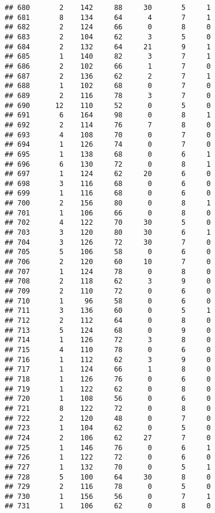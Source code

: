 \documentclass[
]{article}
\begin{document}
\begin{verbatim}
## 680       2    142     88     30       5     1
## 681       8    134     64      4       7     1
## 682       2    124     66      0       8     0
## 683       2    104     62      3       5     0
## 684       2    132     64     21       9     1
## 685       1    140     82      3       7     1
## 686       2    102     66      1       7     0
## 687       2    136     62      2       7     1
## 688       1    102     68      0       7     0
## 689       2    116     78      3       7     0
## 690      12    110     52      0       5     0
## 691       6    164     98      0       8     1
## 692       2    114     76      7       8     0
## 693       4    108     70      0       7     0
## 694       1    126     74      0       7     0
## 695       1    138     68      0       6     1
## 696       6    130     72      0       8     1
## 697       1    124     62     20       6     0
## 698       3    116     68      0       6     0
## 699       1    116     68      0       6     0
## 700       2    156     80      0       8     1
## 701       1    106     66      0       8     0
## 702       4    122     70     30       5     0
## 703       3    120     80     30       6     1
## 704       3    126     72     30       7     0
## 705       5    106     58      0       6     0
## 706       2    120     60     10       7     0
## 707       1    124     78      0       8     0
## 708       2    118     62      3       9     0
## 709       2    110     72      0       6     0
## 710       1     96     58      0       6     0
## 711       3    136     60      0       5     1
## 712       2    112     64      0       8     0
## 713       5    124     68      0       9     0
## 714       1    126     72      3       8     0
## 715       4    110     78      0       6     0
## 716       1    112     62      3       9     0
## 717       1    124     66      1       8     0
## 718       1    126     76      0       6     0
## 719       1    122     62      0       8     0
## 720       1    108     56      0       6     0
## 721       8    122     72      0       8     0
## 722       2    120     48      0       7     0
## 723       1    104     62      0       5     0
## 724       2    106     62     27       7     0
## 725       1    146     76      0       6     1
## 726       1    122     72      0       6     0
## 727       1    132     70      0       5     1
## 728       5    100     64     30       8     0
## 729       2    116     78      0       5     0
## 730       1    156     56      0       7     1
## 731       1    106     62      0       8     0

\end{verbatim}
\end{document}
